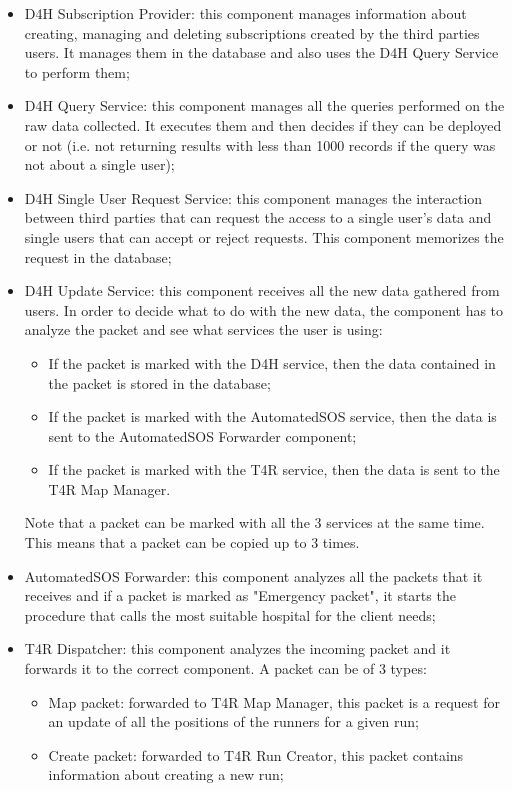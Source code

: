 \begin{itemize}
\begin{itemize}
\end{itemize}
\item D4H Subscription Provider: this component manages information about creating, managing and deleting subscriptions created by the third parties users. It manages them in the database and also uses the D4H Query Service to perform them;
\item D4H Query Service: this component manages all the queries performed on the raw data collected. It executes them and then decides if they can be deployed or not (i.e. not returning results with less than 1000 records if the query was not about a single user);
\item D4H Single User Request Service: this component manages the interaction between third parties that can request the access to a single user's data and single users that can accept or reject requests. This component memorizes the request in the database;
\item D4H Update Service: this component receives all the new data gathered from users. In order to decide what to do with the new data, the component has to analyze the packet and see what services the user is using:
\begin{itemize}
\item If the packet is marked with the D4H service, then the data contained in the packet is stored in the database;
\item If the packet is marked with the AutomatedSOS service, then the data is sent to the AutomatedSOS Forwarder component;
\item If the packet is marked with the T4R service, then the data is sent to the T4R Map Manager.
\end{itemize}
Note that a packet can be marked with all the 3 services at the same time. This means that a packet can be copied up to 3 times.
\item AutomatedSOS Forwarder: this component analyzes all the packets that it receives and if a packet is marked as "Emergency packet", it starts the procedure that calls the most suitable hospital for the client needs;
\item T4R Dispatcher: this component analyzes the incoming packet and it forwards it to the correct component. A packet can be of 3 types:
\begin{itemize}
\item Map packet: forwarded to T4R Map Manager, this packet is a request for an update of all the positions of the runners for a given run;
\item Create packet: forwarded to T4R Run Creator, this packet contains information about creating a new run;

\end{itemize}
\end{itemize}
